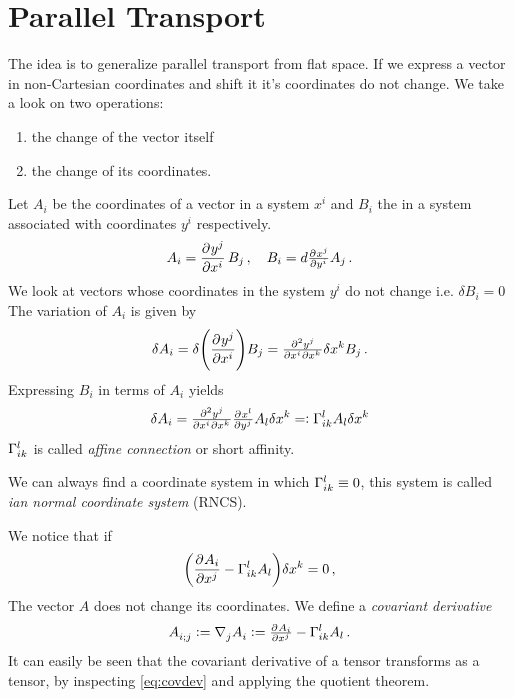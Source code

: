\section{Parallel Transport}
The idea is to generalize parallel transport from flat space.
If we express a vector in non-Cartesian coordinates and shift it it's
coordinates do not change.
We take a look on two operations:
\begin{enumerate}
\item the change of the vector itself
\item the change of its coordinates.
\end{enumerate}
Let $A_i$ be the coordinates of a vector in a system $x^i$ and $B_i$ the in a
system associated with coordinates $y^i$ respectively.
\begin{equation}
A_i=\dpd{{y^j}}{{x^i}}B_j\, ,\quad B_i=d\pd{{x^j}}{{y^i}}A_j\, .
\end{equation}
We look at vectors whose coordinates in the system $y^i$ do not change i.e.
$\delta B_i=0$ The variation of $A_i$ is given by
\begin{equation}
\delta
A_i=\delta\left(\dpd{{y^j}}{{x^i}}\right)B_j
=\md{{y^j}}{2}{{x^i}}{}{{x^k}}{}\delta
x^k B_j\, .
\end{equation}
Expressing $B_i$ in terms of $A_i$ yields
\begin{equation}
\delta A_i = \md{{y^j}}{2}{{x^i}}{}{{x^k}}{}\pd{{x^l}}{{y^j}}A_l\delta x^k
=:\affin{l}{i}{k}A_l\delta x^k
\end{equation}
$\Gamma^{l}_{i k}$ is called \emph{affine connection} or short affinity.
\begin{remark}
We can always find a coordinate system in which $\Gamma^{l}_{i k}\equiv 0$, this
system is called \emph{ian normal coordinate system} (RNCS).
\end{remark}
We notice that if 
\begin{equation}
\left(\dpd{{A_i}}{{x^j}}-\affin{l}{i}{k}A_l\right)\delta x^k = 0\,
,\label{eq:covdev}
\end{equation}
The vector $A$ does not change its coordinates. We define a \emph{covariant
derivative} 
\begin{equation}
\tensor{A}{_i_;_j}:=\tensor{\nabla}{_j}\tensor{A}{_i}:=\pd{{A_i}}{{x^j}}-\affin{l}{i}{k}A_l\,
.
\end{equation}
It can easily be seen that the covariant derivative of a tensor transforms as a
tensor, by inspecting \eqref{eq:covdev} and applying the quotient theorem.
